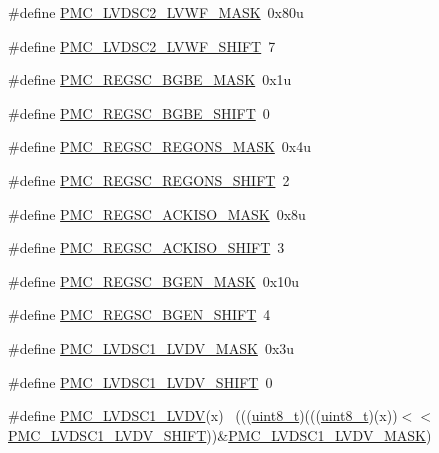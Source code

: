 \begin{DoxyCompactItemize}
\#define \hyperlink{group___p_m_c___register___masks_ga34187b0598a3e166a457818770a616d4}{P\+M\+C\+\_\+\+L\+V\+D\+S\+C2\+\_\+\+L\+V\+W\+F\+\_\+\+M\+A\+SK}~0x80u
\item 
\#define \hyperlink{group___p_m_c___register___masks_ga8bcfb9fc5fd4a92164b2aa6cdb6db77e}{P\+M\+C\+\_\+\+L\+V\+D\+S\+C2\+\_\+\+L\+V\+W\+F\+\_\+\+S\+H\+I\+FT}~7
\item 
\#define \hyperlink{group___p_m_c___register___masks_ga98cf5c98c133e20fb620faa6ca29d98e}{P\+M\+C\+\_\+\+R\+E\+G\+S\+C\+\_\+\+B\+G\+B\+E\+\_\+\+M\+A\+SK}~0x1u
\item 
\#define \hyperlink{group___p_m_c___register___masks_ga2e23aa8155158c86fc53ccd8baccf24d}{P\+M\+C\+\_\+\+R\+E\+G\+S\+C\+\_\+\+B\+G\+B\+E\+\_\+\+S\+H\+I\+FT}~0
\item 
\#define \hyperlink{group___p_m_c___register___masks_gab830f2c82eef6d0db7caab8ee5689ba6}{P\+M\+C\+\_\+\+R\+E\+G\+S\+C\+\_\+\+R\+E\+G\+O\+N\+S\+\_\+\+M\+A\+SK}~0x4u
\item 
\#define \hyperlink{group___p_m_c___register___masks_ga06b4e6d970f2610a635c92bb1270541d}{P\+M\+C\+\_\+\+R\+E\+G\+S\+C\+\_\+\+R\+E\+G\+O\+N\+S\+\_\+\+S\+H\+I\+FT}~2
\item 
\#define \hyperlink{group___p_m_c___register___masks_ga35ced6f0f133b2d5892bdcba3e0b2832}{P\+M\+C\+\_\+\+R\+E\+G\+S\+C\+\_\+\+A\+C\+K\+I\+S\+O\+\_\+\+M\+A\+SK}~0x8u
\item 
\#define \hyperlink{group___p_m_c___register___masks_gad2b9b6ce6aa455e8607fd3c2d1647544}{P\+M\+C\+\_\+\+R\+E\+G\+S\+C\+\_\+\+A\+C\+K\+I\+S\+O\+\_\+\+S\+H\+I\+FT}~3
\item 
\#define \hyperlink{group___p_m_c___register___masks_ga7e1520a56f4d2675018d5efaa9492f19}{P\+M\+C\+\_\+\+R\+E\+G\+S\+C\+\_\+\+B\+G\+E\+N\+\_\+\+M\+A\+SK}~0x10u
\item 
\#define \hyperlink{group___p_m_c___register___masks_gab43d258e6864ee3a7a728de1d720f6fe}{P\+M\+C\+\_\+\+R\+E\+G\+S\+C\+\_\+\+B\+G\+E\+N\+\_\+\+S\+H\+I\+FT}~4
\item 
\#define \hyperlink{group___p_m_c___register___masks_ga777eada2a526d88569a30323e9d3e1d3}{P\+M\+C\+\_\+\+L\+V\+D\+S\+C1\+\_\+\+L\+V\+D\+V\+\_\+\+M\+A\+SK}~0x3u
\item 
\#define \hyperlink{group___p_m_c___register___masks_gaaf45daa6de387f93bc57f1218ab17a16}{P\+M\+C\+\_\+\+L\+V\+D\+S\+C1\+\_\+\+L\+V\+D\+V\+\_\+\+S\+H\+I\+FT}~0
\item 
\#define \hyperlink{group___p_m_c___register___masks_gaa14e8452bdb4c61c57ed23eda94f715a}{P\+M\+C\+\_\+\+L\+V\+D\+S\+C1\+\_\+\+L\+V\+DV}(x)                                          ~(((\hyperlink{_p_e___types_8h_aba7bc1797add20fe3efdf37ced1182c5}{uint8\+\_\+t})(((\hyperlink{_p_e___types_8h_aba7bc1797add20fe3efdf37ced1182c5}{uint8\+\_\+t})(x))$<$$<$\hyperlink{group___p_m_c___register___masks_gaaf45daa6de387f93bc57f1218ab17a16}{P\+M\+C\+\_\+\+L\+V\+D\+S\+C1\+\_\+\+L\+V\+D\+V\+\_\+\+S\+H\+I\+FT}))\&\hyperlink{group___p_m_c___register___masks_ga777eada2a526d88569a30323e9d3e1d3}{P\+M\+C\+\_\+\+L\+V\+D\+S\+C1\+\_\+\+L\+V\+D\+V\+\_\+\+M\+A\+SK})
$$
\end{DoxyCompactItemize}
